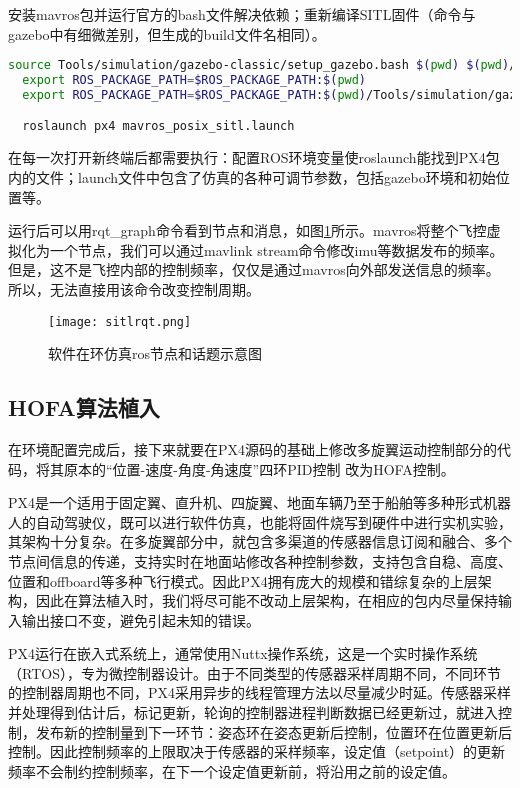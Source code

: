 安装mavros包并运行官方的bash文件解决依赖；重新编译SITL固件（命令与gazebo中有细微差别，但生成的build文件名相同）。

  \begin{lstlisting}[language=Bash, basicstyle=\footnotesize, linewidth=\linewidth, breaklines=true]
  source Tools/simulation/gazebo-classic/setup_gazebo.bash $(pwd) $(pwd)/build/px4_sitl_default
  export ROS_PACKAGE_PATH=$ROS_PACKAGE_PATH:$(pwd)
  export ROS_PACKAGE_PATH=$ROS_PACKAGE_PATH:$(pwd)/Tools/simulation/gazebo-classic/sitl_gazebo-classic

  roslaunch px4 mavros_posix_sitl.launch
\end{lstlisting}

在每一次打开新终端后都需要执行：配置ROS环境变量使roslaunch能找到PX4包内的文件；launch文件中包含了仿真的各种可调节参数，包括gazebo环境和初始位置等。

运行后可以用rqt\_graph命令看到节点和消息，如图\ref{sitlrqt}所示。mavros将整个飞控虚拟化为一个节点，我们可以通过mavlink stream命令修改imu等数据发布的频率。但是，这不是飞控内部的控制频率，仅仅是通过mavros向外部发送信息的频率。所以，无法直接用该命令改变控制周期。
\begin{figure}[!h]
  \centering
  \texttt{[image: sitlrqt.png]}
  \caption{软件在环仿真ros节点和话题示意图}
  \label{sitlrqt}
\end{figure}

 \subsection{HOFA算法植入}
在环境配置完成后，接下来就要在PX4源码的基础上修改多旋翼运动控制部分的代码，将其原本的“位置-速度-角度-角速度”四环PID控制 \cite{px4控制}改为HOFA控制。

PX4是一个适用于固定翼、直升机、四旋翼、地面车辆乃至于船舶等多种形式机器人的自动驾驶仪，既可以进行软件仿真，也能将固件烧写到硬件中进行实机实验，其架构十分复杂。在多旋翼部分中，就包含多渠道的传感器信息订阅和融合、多个节点间信息的传递，支持实时在地面站修改各种控制参数，支持包含自稳、高度、位置和offboard等多种飞行模式。因此PX4拥有庞大的规模和错综复杂的上层架构，因此在算法植入时，我们将尽可能不改动上层架构，在相应的包内尽量保持输入输出接口不变，避免引起未知的错误。

PX4运行在嵌入式系统上，通常使用Nuttx操作系统，这是一个实时操作系统（RTOS），专为微控制器设计。由于不同类型的传感器采样周期不同，不同环节的控制器周期也不同，PX4采用异步的线程管理方法以尽量减少时延。传感器采样并处理得到估计后，标记更新，轮询的控制器进程判断数据已经更新过，就进入控制，发布新的控制量到下一环节：姿态环在姿态更新后控制，位置环在位置更新后控制。因此控制频率的上限取决于传感器的采样频率，设定值（setpoint）的更新频率不会制约控制频率，在下一个设定值更新前，将沿用之前的设定值。

